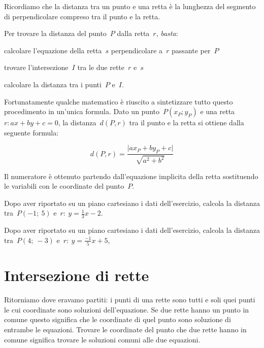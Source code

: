 Ricordiamo che la distanza tra un punto e una retta è la lunghezza del 
segmento di perpendicolare compreso tra il punto e la retta.


\begin{procedura}
 Per trovare la distanza del punto~$P$ dalla retta~$r$, \emph{basta}:
 \begin{enumeratea}
  \item calcolare l'equazione della retta~$s$ perpendicolare a~$r$ passante 
   per~$P$
  \item trovare l'intersezione~$I$ tra le due rette~$r$ e~$s$
  \item calcolare la distanza tra i punti~$P$ e~$I$.
 \end{enumeratea}
\end{procedura}

Fortunatamente qualche matematico è riuscito a sintetizzare tutto questo 
procedimento in un'unica formula. 
Dato un punto~$P(x_P; y_P)$ e 
una retta~$r: ax+by+c=0$,
la distanza~$d(P, r)$ tra il punto e la retta si ottiene
dalla seguente formula:

\[d(P, r) = \frac{\lvert ax_P +by_P + c\rvert}{\sqrt{a^2 + b^2}}\]

Il numeratore è ottenuto partendo dall'equazione implicita della retta 
sostituendo le variabili con le coordinate del punto~$P$.

\begin{exrig}
 \begin{esempio}
  Dopo aver riportato su un piano cartesiano i dati dell'esercizio,
  calcola la distanza tra~$P(-1;~5)$ e~$r:~y = \frac{1}{3} x -2$. 
 \end{esempio}
 \begin{esempio}
  Dopo aver riportato su un piano cartesiano i dati dell'esercizio,
  calcola la distanza tra~$P(4;~-3)$ e~$r:~y = \frac{-1}{5} x +5$,
 \end{esempio}
\end{exrig}

\section{Intersezione di rette}
\label{sec:retta_intersezionedirette}

Ritorniamo dove eravamo partiti: i punti di una rette sono tutti e soli quei 
punti le cui coordinate sono soluzioni dell'equazione. Se due rette hanno un 
punto in comune questo significa che le coordinate di quel punto sono 
soluzione di entrambe le equazioni. Trovare le coordinate del punto che due 
rette hanno in comune significa trovare le soluzioni comuni alle due equazioni.

